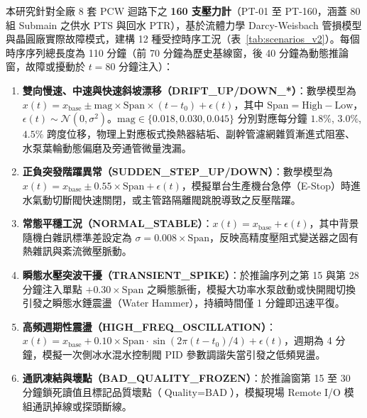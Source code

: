 \documentclass[fontset=none, a4paper, 12pt]{ctexart}
\begin{document}
\begin{doublespace}
本研究針對全廠 8 套 PCW 迴路下之 \textbf{160 支壓力計}（PT-01 至 PT-160，涵蓋 80 組 Submain 之供水 PTS 與回水 PTR），基於流體力學 Darcy-Weisbach 管損模型與晶圓廠實際故障模式，建構 12 種受控時序工況（表~\ref{tab:scenarios_v2}）。每個時序序列總長度為 110 分鐘（前 70 分鐘為歷史基線窗，後 40 分鐘為動態推論窗，故障或擾動於 $t=80$ 分鐘注入）：
\begin{enumerate}
    \item \textbf{雙向慢速、中速與快速斜坡漂移（DRIFT\_UP/DOWN\_*）}：數學模型為 $x(t) = x_{\mathrm{base}} \pm \mathrm{mag} \times \mathrm{Span} \times (t-t_0) + \epsilon(t)$，其中 $\mathrm{Span} = \mathrm{High} - \mathrm{Low}$，$\epsilon(t) \sim \mathcal{N}(0, \sigma^2)$。$\mathrm{mag} \in \{0.018, 0.030, 0.045\}$ 分別對應每分鐘 $1.8\%$, $3.0\%$, $4.5\%$ 跨度位移，物理上對應板式換熱器結垢、副幹管濾網雜質漸進式阻塞、水泵葉輪動態偏磨及旁通管微量洩漏。
    \item \textbf{正負突發階躍異常（SUDDEN\_STEP\_UP/DOWN）}：數學模型為 $x(t) = x_{\mathrm{base}} \pm 0.55 \times \mathrm{Span} + \epsilon(t)$，模擬單台生產機台急停（E-Stop）時進水氣動切斷閥快速關閉，或主管路隔離閥跳脫導致之反壓階躍。
    \item \textbf{常態平穩工況（NORMAL\_STABLE）}：$x(t) = x_{\mathrm{base}} + \epsilon(t)$，其中背景隨機白雜訊標準差設定為 $\sigma = 0.008 \times \mathrm{Span}$，反映高精度壓阻式變送器之固有熱雜訊與紊流微壓脈動。
    \item \textbf{瞬態水壓突波干擾（TRANSIENT\_SPIKE）}：於推論序列之第 15 與第 28 分鐘注入單點 $+0.30 \times \mathrm{Span}$ 之瞬態脈衝，模擬大功率水泵啟動或快開閥切換引發之瞬態水錘震盪（Water Hammer），持續時間僅 1 分鐘即迅速平復。
    \item \textbf{高頻週期性震盪（HIGH\_FREQ\_OSCILLATION）}：$x(t) = x_{\mathrm{base}} + 0.10 \times \mathrm{Span} \cdot \sin(2\pi(t-t_0)/4) + \epsilon(t)$，週期為 4 分鐘，模擬一次側冰水混水控制閥 PID 參數調諧失當引發之低頻晃盪。
    \item \textbf{通訊凍結與壞點（BAD\_QUALITY\_FROZEN）}：於推論窗第 15 至 30 分鐘鎖死讀值且標記品質壞點（$\text{Quality} = \text{BAD}$），模擬現場 Remote I/O 模組通訊掉線或探頭斷線。
\end{enumerate}


\end{doublespace}
\end{document}
